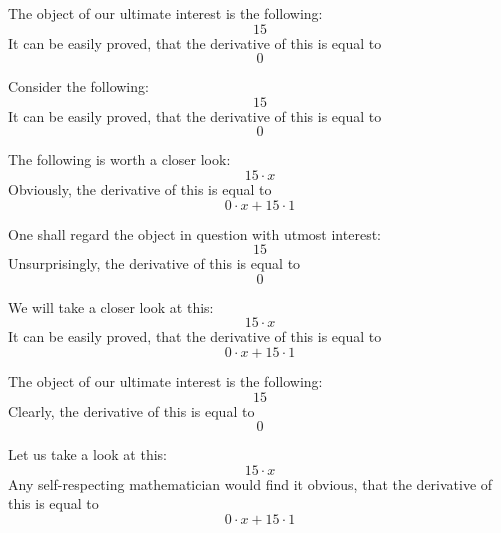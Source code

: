 \documentclass{article}
\begin{document}
The object of our ultimate interest is the following:
\begin{equation}
15 
\end{equation}
It can be easily proved, that the derivative of this is equal to
\begin{equation}
0 
\end{equation}

Consider the following:
\begin{equation}
15 
\end{equation}
It can be easily proved, that the derivative of this is equal to
\begin{equation}
0 
\end{equation}

The following is worth a closer look:
\begin{equation}
15 \cdot x 
\end{equation}
Obviously, the derivative of this is equal to
\begin{equation}
0 \cdot x + 15 \cdot 1 
\end{equation}

One shall regard the object in question with utmost interest:
\begin{equation}
15 
\end{equation}
Unsurprisingly, the derivative of this is equal to
\begin{equation}
0 
\end{equation}

We will take a closer look at this:
\begin{equation}
15 \cdot x 
\end{equation}
It can be easily proved, that the derivative of this is equal to
\begin{equation}
0 \cdot x + 15 \cdot 1 
\end{equation}

The object of our ultimate interest is the following:
\begin{equation}
15 
\end{equation}
Clearly, the derivative of this is equal to
\begin{equation}
0 
\end{equation}

Let us take a look at this:
\begin{equation}
15 \cdot x 
\end{equation}
Any self-respecting mathematician would find it obvious, that the derivative of this is equal to
\begin{equation}
0 \cdot x + 15 \cdot 1 
\end{equation}
\end{document}
